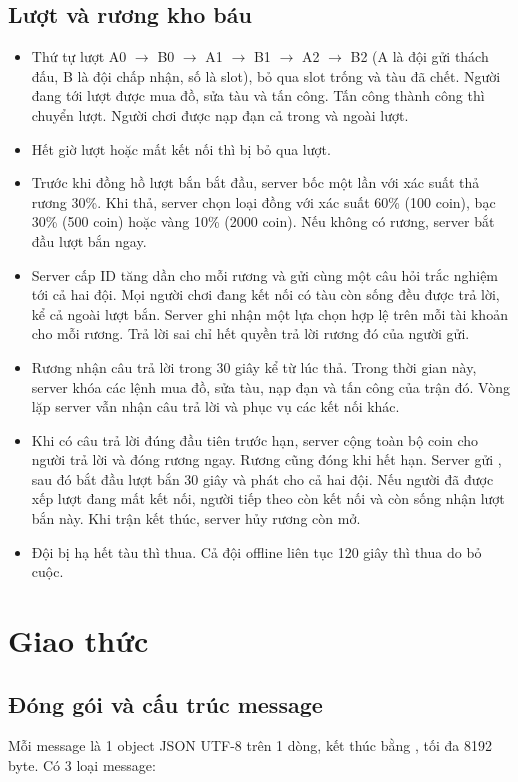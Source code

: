 \documentclass[12pt,a4paper]{article}
\newcommand{\cmd}[1]{\texttt{\seqsplit{#1}}}
\begin{document}
\subsection{Lượt và rương kho báu}
\begin{itemize}
  \item Thứ tự lượt A0 $\rightarrow$ B0 $\rightarrow$ A1 $\rightarrow$ B1 $\rightarrow$ A2 $\rightarrow$ B2 (A là đội gửi thách đấu, B là đội chấp nhận, số là slot), bỏ qua slot trống và tàu đã chết. Người đang tới lượt được mua đồ, sửa tàu và tấn công. Tấn công thành công thì chuyển lượt. Người chơi được nạp đạn cả trong và ngoài lượt.
  \item Hết giờ lượt hoặc mất kết nối thì bị bỏ qua lượt.
  \item Trước khi đồng hồ lượt bắn bắt đầu, server bốc một lần với xác suất thả rương 30\%. Khi thả, server chọn loại đồng với xác suất 60\% (100 coin), bạc 30\% (500 coin) hoặc vàng 10\% (2000 coin). Nếu không có rương, server bắt đầu lượt bắn ngay.
  \item Server cấp ID tăng dần cho mỗi rương và gửi cùng một câu hỏi trắc nghiệm tới cả hai đội. Mọi người chơi đang kết nối có tàu còn sống đều được trả lời, kể cả ngoài lượt bắn. Server ghi nhận một lựa chọn hợp lệ trên mỗi tài khoản cho mỗi rương. Trả lời sai chỉ hết quyền trả lời rương đó của người gửi.
  \item Rương nhận câu trả lời trong 30 giây kể từ lúc thả. Trong thời gian này, server khóa các lệnh mua đồ, sửa tàu, nạp đạn và tấn công của trận đó. Vòng lặp server vẫn nhận câu trả lời và phục vụ các kết nối khác.
  \item Khi có câu trả lời đúng đầu tiên trước hạn, server cộng toàn bộ coin cho người trả lời và đóng rương ngay. Rương cũng đóng khi hết hạn. Server gửi \cmd{CHEST\_RESULT}, sau đó bắt đầu lượt bắn 30 giây và phát \cmd{TURN\_START} cho cả hai đội. Nếu người đã được xếp lượt đang mất kết nối, người tiếp theo còn kết nối và còn sống nhận lượt bắn này. Khi trận kết thúc, server hủy rương còn mở.
  \item Đội bị hạ hết tàu thì thua. Cả đội offline liên tục 120 giây thì thua do bỏ cuộc.
\end{itemize}

\section{Giao thức}

\subsection{Đóng gói và cấu trúc message}
Mỗi message là 1 object JSON UTF-8 trên 1 dòng, kết thúc bằng \cmd{\textbackslash r\textbackslash n}, tối đa 8192 byte. Có 3 loại message:
\end{document}
